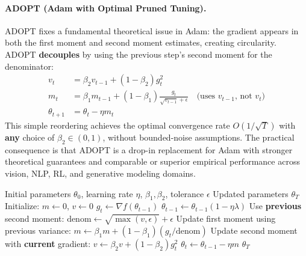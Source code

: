 \paragraph{ADOPT (Adam with Optimal Pruned Tuning).}
ADOPT fixes a fundamental theoretical issue in Adam: the gradient appears in both the first moment and second moment estimates, creating circularity. ADOPT \textbf{decouples} by using the previous step's second moment for the denominator:
\begin{align}
v_t &= \beta_2 v_{t-1} + (1-\beta_2)g_t^2 \\
m_t &= \beta_1 m_{t-1} + (1-\beta_1)\frac{g_t}{\sqrt{v_{t-1}}+\epsilon} \quad\text{(uses $v_{t-1}$, not $v_t$)} \\
\theta_{t+1} &= \theta_t - \eta m_t
\end{align}
This simple reordering achieves the optimal convergence rate $O(1/\sqrt{T})$ with \textbf{any} choice of $\beta_2 \in (0,1)$, without bounded-noise assumptions. The practical consequence is that ADOPT is a drop-in replacement for Adam with stronger theoretical guarantees and comparable or superior empirical performance across vision, NLP, RL, and generative modeling domains.

\begin{algorithm}[H]
\caption{ADOPT (Adam with Optimal Pruned Tuning)}
\label{alg:adopt}
\begin{algorithmic}[1]
\Require Initial parameters $\theta_0$, learning rate $\eta$, $\beta_1, \beta_2$, tolerance $\epsilon$
\Ensure Updated parameters $\theta_T$
\State Initialize: $m \gets 0$, $v \gets 0$
    \State $g_t \gets \nabla f(\theta_{t-1})$
        \State $\theta_{t-1} \gets \theta_{t-1}(1 - \eta\lambda)$
    \EndIf
    \State Use \textbf{previous} second moment: $\text{denom} \gets \sqrt{\max(v, \epsilon)} + \epsilon$
    \State Update first moment using previous variance: $m \gets \beta_1 m + (1-\beta_1)(g_t / \text{denom})$
    \State Update second moment with \textbf{current} gradient: $v \gets \beta_2 v + (1-\beta_2) g_t^2$
    \State $\theta_t \gets \theta_{t-1} - \eta m$
\EndFor
\Return $\theta_T$
\end{algorithmic}
\end{algorithm}

